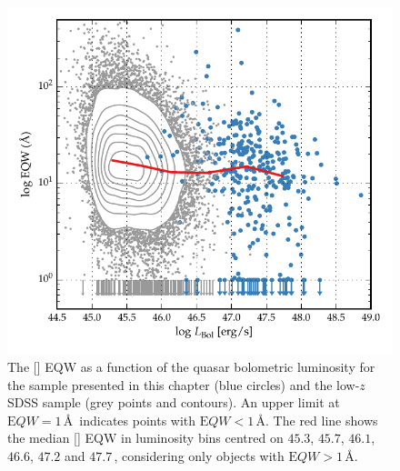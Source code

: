 \begin{figure}[t!]
\centering 
    \includegraphics[width=\columnwidth]{figures/chapter04/eqw_lum.pdf} 
    \caption[{The [] EQW as a function of the quasar bolometric luminosity for the sample presented in this chapter (blue circles) and the low-$z$ SDSS sample (grey points and contours).}]{The [] EQW as a function of the quasar bolometric luminosity for the sample presented in this chapter (blue circles) and the low-$z$ SDSS sample (grey points and contours). An upper limit at ${\mathrm EQW}=1$\,\AA\, indicates points with ${\mathrm EQW} < 1$\,\AA. The red line shows the median [] EQW in luminosity bins centred on $45.3$, $45.7$, $46.1$, $46.6$, $47.2$ and $47.7$\,\ergs, considering only objects with ${\mathrm EQW} > 1 $\,\AA.}     
    \label{fig:eqw_lum}
\end{figure}


